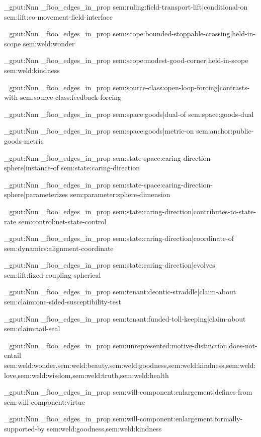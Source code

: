 \prop_gput:Nnn \g_ftoo_edges_in_prop { sem:ruling:field-transport-lift|conditional-on } { sem:lift:co-movement-field-interface }

\prop_gput:Nnn \g_ftoo_edges_in_prop { sem:scope:bounded-stoppable-crossing|held-in-scope } { sem:weld:wonder }

\prop_gput:Nnn \g_ftoo_edges_in_prop { sem:scope:modest-good-corner|held-in-scope } { sem:weld:kindness }

\prop_gput:Nnn \g_ftoo_edges_in_prop { sem:source-class:open-loop-forcing|contrasts-with } { sem:source-class:feedback-forcing }

\prop_gput:Nnn \g_ftoo_edges_in_prop { sem:space:goods|dual-of } { sem:space:goods-dual }

\prop_gput:Nnn \g_ftoo_edges_in_prop { sem:space:goods|metric-on } { sem:anchor:public-goods-metric }

\prop_gput:Nnn \g_ftoo_edges_in_prop { sem:state-space:caring-direction-sphere|instance-of } { sem:state:caring-direction }

\prop_gput:Nnn \g_ftoo_edges_in_prop { sem:state-space:caring-direction-sphere|parameterizes } { sem:parameter:sphere-dimension }

\prop_gput:Nnn \g_ftoo_edges_in_prop { sem:state:caring-direction|contributes-to-state-rate } { sem:control:net-state-control }

\prop_gput:Nnn \g_ftoo_edges_in_prop { sem:state:caring-direction|coordinate-of } { sem:dynamics:alignment-coordinate }

\prop_gput:Nnn \g_ftoo_edges_in_prop { sem:state:caring-direction|evolves } { sem:lift:fixed-coupling-spherical }

\prop_gput:Nnn \g_ftoo_edges_in_prop { sem:tenant:deontic-straddle|claim-about } { sem:claim:one-sided-susceptibility-test }

\prop_gput:Nnn \g_ftoo_edges_in_prop { sem:tenant:funded-toll-keeping|claim-about } { sem:claim:tail-seal }

\prop_gput:Nnn \g_ftoo_edges_in_prop { sem:unrepresented:motive-distinction|does-not-entail } { sem:weld:wonder,sem:weld:beauty,sem:weld:goodness,sem:weld:kindness,sem:weld:love,sem:weld:wisdom,sem:weld:truth,sem:weld:health }

\prop_gput:Nnn \g_ftoo_edges_in_prop { sem:will-component:enlargement|defines-from } { sem:will-component:virtue }

\prop_gput:Nnn \g_ftoo_edges_in_prop { sem:will-component:enlargement|formally-supported-by } { sem:weld:goodness,sem:weld:kindness }

